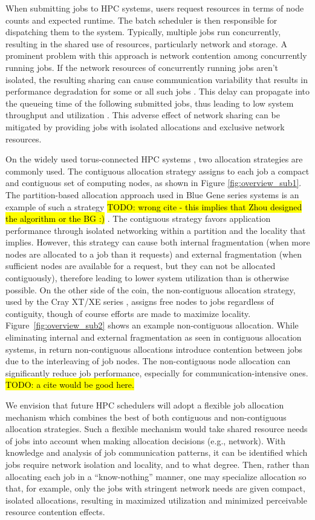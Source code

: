 \documentclass[conference]{IEEEtran}
\newcommand{\TODO}[1]{\hl{TODO: #1}}
\begin{document}
When submitting jobs to HPC systems, users request resources in terms of node counts and expected runtime. The batch scheduler is then responsible for dispatching them to the system. Typically, multiple jobs run concurrently, resulting in the shared use of resources, particularly network and storage. A prominent problem with this approach is network contention among concurrently running jobs. If the network resources of concurrently running jobs aren't isolated, the resulting sharing can cause communication variability that results in performance degradation for some or all such jobs \cite{abhinav-sc13}. This delay can propagate into the queueing time of the following submitted jobs, thus leading to low system throughput and utilization \cite{jose-ipdps15}. This adverse effect of network sharing can be mitigated by providing jobs with isolated allocations and exclusive network resources.

On the widely used torus-connected HPC systems \cite{bgq,tofu,titan}, two allocation strategies are commonly used. The contiguous allocation strategy assigns to each job a compact and contiguous set of computing nodes, as shown in Figure \ref{fig:overview_sub1}. The partition-based allocation approach used in Blue Gene series systems is an example of such a strategy  \cite{zhou-ipdps} \TODO{wrong cite - this implies that Zhou designed the algorithm or the BG :) }. The contiguous strategy favors application performance through isolated networking within a partition and the locality that implies. However, this strategy can cause both internal fragmentation (when more nodes are allocated to a job than it requests) and external fragmentation (when sufficient nodes are available for a request, but they can not be allocated contiguously), therefore leading to lower system utilization than is otherwise possible. On the other side of the coin, the non-contiguous allocation strategy, used by the Cray XT/XE series \cite{carl-cug}, assigns free nodes to jobs regardless of contiguity, though of course efforts are made to maximize locality. Figure~\ref{fig:overview_sub2} shows an example non-contiguous allocation. While eliminating internal and external fragmentation as seen in contiguous allocation systems, in return non-contiguous allocations introduce contention between jobs due to the interleaving of job nodes. The non-contiguous node allocation can significantly reduce job performance, especially for communication-intensive ones. \TODO{a cite would be good here.}

We envision that future HPC schedulers will adopt a flexible job allocation mechanism which combines the best of both contiguous and non-contiguous allocation strategies. Such a flexible mechanism would take shared resource needs of jobs into account when making allocation decisions (e.g., network). With knowledge and analysis of job communication patterns, it can be identified which jobs require network isolation and locality, and to what degree. Then, rather than allocating each job in a ``know-nothing'' manner, one may specialize allocation so that, for example, only the jobs with stringent network needs are given compact, isolated allocations, resulting in maximized utilization and minimized perceivable resource contention effects.
\end{document}
